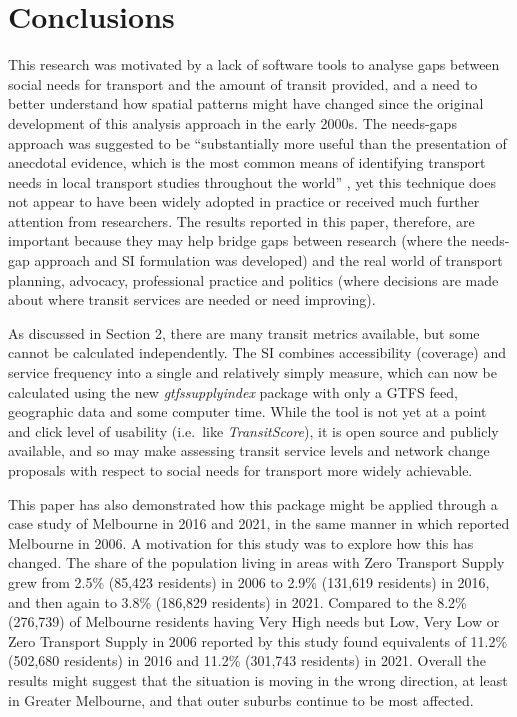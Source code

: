 \documentclass[preprint, 3p,
authoryear]{elsarticle} %
\begin{document}
\section{Conclusions}\label{conclusions}

This research was motivated by a lack of software tools to analyse gaps
between social needs for transport and the amount of transit provided,
and a need to better understand how spatial patterns might have changed
since the original development of this analysis approach in the early
2000s. The needs-gaps approach was suggested to be ``substantially more
useful than the presentation of anecdotal evidence, which is the most
common means of identifying transport needs in local transport studies
throughout the world'' \citep{currie2010identifying}, yet this technique
does not appear to have been widely adopted in practice or received much
further attention from researchers. The results reported in this paper,
therefore, are important because they may help bridge gaps between
research (where the needs-gap approach and SI formulation was developed)
and the real world of transport planning, advocacy, professional
practice and politics (where decisions are made about where transit
services are needed or need improving).

As discussed in Section 2, there are many transit metrics available, but
some cannot be calculated independently. The SI combines accessibility
(coverage) and service frequency into a single and relatively simply
measure, which can now be calculated using the new
\emph{gtfssupplyindex} package with only a GTFS feed, geographic data
and some computer time. While the tool is not yet at a point and click
level of usability (i.e.~like \emph{TransitScore}), it is open source
and publicly available, and so may make assessing transit service levels
and network change proposals with respect to social needs for transport
more widely achievable.

This paper has also demonstrated how this package might be applied
through a case study of Melbourne in 2016 and 2021, in the same manner
in which \citet{currie2010identifying} reported Melbourne in 2006. A
motivation for this study was to explore how this has changed. The share
of the population living in areas with Zero Transport Supply grew from
2.5\% (85,423 residents) in 2006 to 2.9\% (131,619 residents) in 2016,
and then again to 3.8\% (186,829 residents) in 2021. Compared to the
8.2\% (276,739) of Melbourne residents having Very High needs but Low,
Very Low or Zero Transport Supply in 2006 reported by
\citet{currie2010identifying} this study found equivalents of 11.2\%
(502,680 residents) in 2016 and 11.2\% (301,743 residents) in 2021.
Overall the results might suggest that the situation is moving in the
wrong direction, at least in Greater Melbourne, and that outer suburbs
continue to be most affected.
\end{document}

